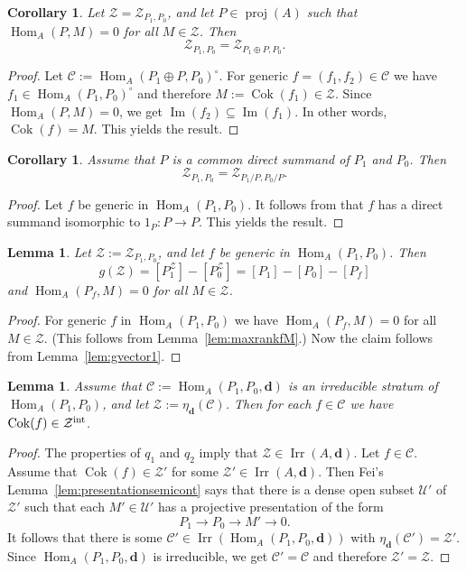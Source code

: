 \documentclass[12pt,reqno]{amsart}
\newtheorem{Lem}[Thm]{Lemma}
\newtheorem{Cor}[Thm]{Corollary}
\theoremstyle{definition}
\newcommand{\df}{\colon}
\newcommand{\cC}{{\mathcal C}}
\newcommand{\bd}{\mathbf{d}}
\newcommand{\proj}{\operatorname{proj}}
\newcommand{\Hom}{\operatorname{Hom}}
\newcommand{\Ima}{\operatorname{Im}}
\newcommand{\Coker}{\operatorname{Cok}}
\newcommand{\irr}{\operatorname{Irr}}
\newcommand{\calU}{\mathcal{U}}
\newcommand{\calZ}{\mathcal{Z}}
\begin{document}
\begin{Cor}\label{cor:bundle8}
Let $\calZ = \calZ_{P_1,P_0}$, and let
$P \in \proj(A)$ such that
$\Hom_A(P,M) = 0$ for all $M \in \calZ$.
Then
$$
\calZ_{P_1,P_0} = \calZ_{P_1 \oplus P,P_0}.
$$
\end{Cor}

\begin{proof}
Let $\cC := \Hom_A(P_1 \oplus P,P_0)^\circ$.
For generic $f = (f_1,f_2) \in \cC$ we have
$f_1 \in \Hom_A(P_1,P_0)^\circ$ and therefore
$M := \Coker(f_1) \in \calZ$.
Since $\Hom_A(P,M) = 0$, we get $\Ima(f_2) \subseteq \Ima(f_1)$.
In other words, $\Coker(f) = M$.
This yields the result.
\end{proof}


\begin{Cor}\label{cor:bundle5}
Assume that $P$ is a common direct summand
of $P_1$ and $P_0$.
Then
$$
\calZ_{P_1,P_0} = \calZ_{P_1/P,P_0/P}.
$$
\end{Cor}

\begin{proof}
Let $f$ be generic in $\Hom_A(P_1,P_0)$.
It follows from \cite[Corollary~4.2]{DF15} that $f$ has
a direct summand isomorphic to $1_P\df P \to P$.
This yields the result.
\end{proof}




\begin{Lem}\label{lem:gvector2}
\label{prop:plamondon1b}
Let $\calZ := \calZ_{P_1,P_0}$, and let
$f$ be generic in $\Hom_A(P_1,P_0)$.
Then
$$
g(\calZ) = [P_1^{\calZ}] - [P_0^{\calZ}] = [P_1] - [P_0] - [P_f]
$$
and $\Hom_A(P_f,M) = 0$ for all $M \in \calZ$.
\end{Lem}

\begin{proof}
For generic $f$ in
$\Hom_A(P_1,P_0)$ we have
$\Hom_A(P_f,M) = 0$ for all $M \in \calZ$.
(This follows from Lemma~\ref{lem:maxrankfM}.)
Now the claim follows from Lemma~\ref{lem:gvector1}.
\end{proof}


\begin{Lem}\label{lem:bundle6}
Assume that $\cC := \Hom_A(P_1,P_0,\bd)$ is an irreducible stratum of
$\Hom_A(P_1,P_0)$, and let
$\calZ := \eta_\bd(\cC)$.
Then for each $f \in \cC$ we have $\Coker(f) \in \calZ^{\rm int}$.
\end{Lem}

\begin{proof}
The properties of $q_1$ and $q_2$ imply that
$\calZ \in \irr(A,\bd)$.
Let $f \in \cC$.
Assume that $\Coker(f) \in \calZ'$ for some $\calZ' \in \irr(A,\bd)$.
Then Fei's Lemma~\ref{lem:presentationsemicont} says that there
is a dense open subset $\calU'$ of $\calZ'$ such that
each $M' \in \calU'$ has a projective presentation
of the form
$$
P_1 \to P_0 \to M' \to 0.
$$
It follows that there is some $\cC' \in \irr(\Hom_A(P_1,P_0,\bd))$
with $\eta_\bd(\cC') = \calZ'$.
Since $\Hom_A(P_1,P_0,\bd)$ is irreducible, we get
$\cC' = \cC$ and therefore
$\calZ' = \calZ$.
\end{proof}
\end{document}
